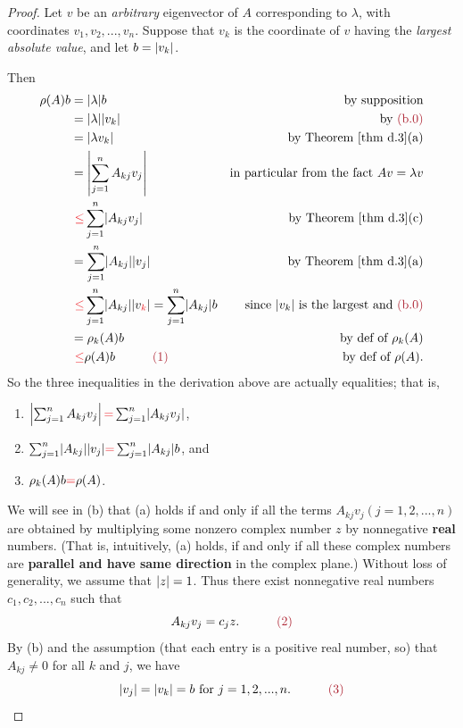 \begin{proof}
Let \(v\) be an \emph{arbitrary} eigenvector of \(A\) corresponding to \(\lambda\), with coordinates \(v_1, v_2, ..., v_n\).
Suppose that \(v_k\) is the coordinate of \(v\) having the \emph{largest absolute value}, and let \(b = \lvert v_k\rvert\). 

Then
\begin{align*}
    \rho(A) b & = \abs{\lambda} b & \text{by supposition} \\
        & = \abs{\lambda} \abs{v_k} & \text{by \MAROON{(b.0)}} \\
        & = \abs{\lambda v_k} & \text{by \THM{d.3}(a)} \\
        & = \left| \sum_{j = 1}^n A_{kj} v_j \right| & \text{in particular from the fact \(Av = \lambda v\)} \\
        &\ \RED{\le} \sum_{j = 1}^n \abs{ A_{kj} v_j } & \text{by \THM{d.3}(c)} \\
        & = \sum_{j = 1}^n \abs{A_{kj}} \abs{v_j} & \text{by \THM{d.3}(a)} \\
        &\ \RED{\le} \sum_{j = 1}^n \abs{A_{kj}} \abs{v_{\RED{k}}} = \sum_{j = 1}^n \abs{A_{kj}} b & \text{since \(\abs{v_k}\) is the largest and \MAROON{(b.0)}} \\
        & = \rho_k(A) b & \text{by def of \(\rho_k(A)\)} \\
        &\ \RED{\le} \rho(A) b \quad \quad \quad \MAROON{(1)} & \text{by def of \(\rho(A)\)}.
\end{align*}
So the three inequalities in the derivation above are actually equalities; that is,
\begin{enumerate}
\item \(\left| \sum_{j = 1}^n A_{kj} v_j \right| \RED{=} \sum_{j = 1}^n \abs{ A_{kj} v_j }\),
\item \(\sum_{j = 1}^n \abs{A_{kj}} \abs{v_j} \RED{=} \sum_{j = 1}^n \abs{A_{kj}} b\), and
\item \(\rho_k(A) b \RED{=} \rho(A)\).
\end{enumerate}

We will see in (b) that (a) holds if and only if all the terms \(A_{kj} v_j (j = 1, 2, ... , n)\) are obtained by multiplying some nonzero complex number \(z\) by nonnegative \textbf{real} numbers.
(That is, intuitively, (a) holds, if and only if all these complex numbers are \textbf{parallel and have same direction} in the complex plane.)
Without loss of generality, we assume that \(\lvert z\rvert = 1\). 
Thus there exist nonnegative real numbers \(c_1, c_2, ..., c_n\) such that
\[
    A_{kj} v_j = c_j z. \quad \quad \quad \MAROON{(2)}
\]
By (b) and the assumption (that each entry is a positive real number, so) that \(A_{kj} \ne 0\) for all \(k\) and \(j\), we have
\[
    \abs{v_j} = \abs{v_k} = b \text{ for } j = 1, 2, ..., n. \quad \quad \quad \MAROON{(3)}
\]


\end{proof}
